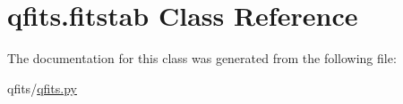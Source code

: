 \hypertarget{classqfits_1_1fitstab}{}\section{qfits.\+fitstab Class Reference}
\label{classqfits_1_1fitstab}


The documentation for this class was generated from the following file\+:\begin{DoxyCompactItemize}
\item 
qfits/\hyperlink{qfits_8py}{qfits.\+py}\end{DoxyCompactItemize}
